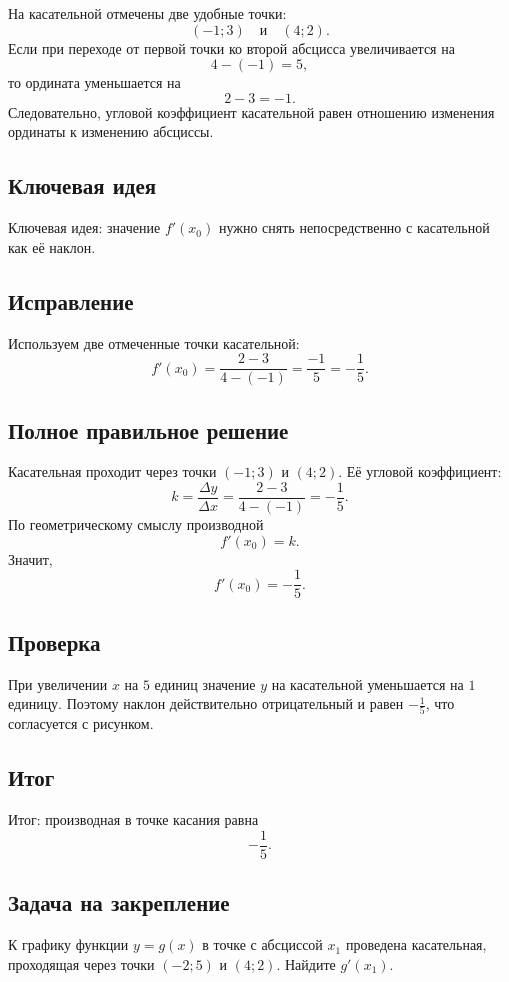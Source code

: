\documentclass[12pt,a4paper]{article}
\begin{document}
На касательной отмечены две удобные точки:
\[
(-1;3)\quad\text{и}\quad(4;2).
\]
Если при переходе от первой точки ко второй абсцисса увеличивается на
\[
4-(-1)=5,
\]
то ордината уменьшается на
\[
2-3=-1.
\]
Следовательно, угловой коэффициент касательной равен отношению изменения ординаты к изменению абсциссы.

\subsection*{Ключевая идея}
\textcolor{blue!60!black}{Ключевая идея:} значение $f'(x_0)$ нужно снять непосредственно с касательной как её наклон.

\subsection*{Исправление}
Используем две отмеченные точки касательной:
\[
f'(x_0)=\frac{2-3}{4-(-1)}
       =\frac{-1}{5}
       =-\frac15.
\]

\subsection*{Полное правильное решение}
Касательная проходит через точки $(-1;3)$ и $(4;2)$. Её угловой коэффициент:
\[
k=\frac{\Delta y}{\Delta x}
  =\frac{2-3}{4-(-1)}
  =-\frac15.
\]
По геометрическому смыслу производной
\[
f'(x_0)=k.
\]
Значит,
\[
\boxed{f'(x_0)=-\frac15}.
\]

\subsection*{Проверка}
При увеличении $x$ на $5$ единиц значение $y$ на касательной уменьшается на $1$ единицу. Поэтому наклон действительно отрицательный и равен $-\frac15$, что согласуется с рисунком.

\subsection*{Итог}
\textcolor{teal!60!black}{Итог:} производная в точке касания равна
\[
-\frac15.
\]

\subsection*{Задача на закрепление}
К графику функции $y=g(x)$ в точке с абсциссой $x_1$ проведена касательная, проходящая через точки $(-2;5)$ и $(4;2)$. Найдите $g'(x_1)$.
\end{document}
